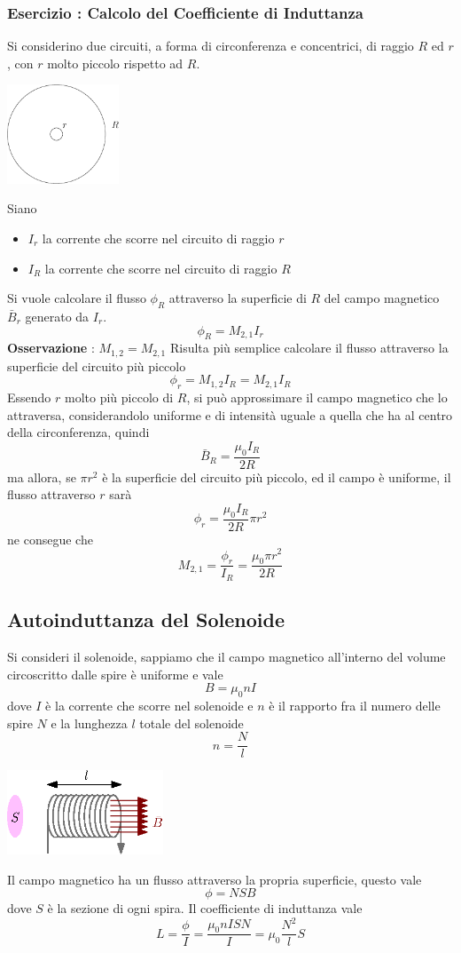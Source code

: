 \documentclass[10pt, letterpaper]{report}
\begin{document}
\subsubsection{Esercizio : Calcolo del Coefficiente di Induttanza}
Si considerino due circuiti, a forma di circonferenza e concentrici, di raggio 
$R$ ed $r$, con $r$ molto piccolo rispetto ad $R$.
\begin{center}
    \includegraphics[width=0.25\textwidth ]{images/cerchiConc.eps}
\end{center}
Siano\begin{itemize}
    \item $I_r$ la corrente che scorre nel circuito di 
    raggio $r$
    \item $I_R$ la corrente che scorre nel circuito di 
    raggio $R$
\end{itemize}
Si vuole calcolare il flusso $\phi_R$ attraverso la superficie di $R$ 
del campo magnetico $\bar B_r$ generato da $I_r$.
$$ \phi_R=M_{2,1}I_r$$
\textbf{Osservazione} : $M_{1,2}=M_{2,1}$\acc 
Risulta più semplice calcolare il flusso attraverso 
la superficie del circuito più piccolo
$$ \phi_r=M_{1,2}I_R=M_{2,1}I_R$$
Essendo $r$ molto più piccolo di $R$, si può approssimare 
il campo magnetico che lo attraversa, considerandolo 
uniforme e di intensità uguale a quella che ha al centro 
della circonferenza, quindi 
$$ \bar B_R=\frac{\mu_0I_R}{2R}$$
ma allora, se $\pi r^2$ è la superficie del circuito 
più piccolo, ed il campo è uniforme, il flusso attraverso 
$r$ sarà 
$$ \phi_r=\frac{\mu_0I_R}{2R}\pi r^2$$
ne consegue che  
$$ M_{2,1}=\frac{\phi_r}{I_R}=\frac{\mu_0\pi r^2}{2R}$$
\subsection{Autoinduttanza del Solenoide}
Si consideri il solenoide, sappiamo che il campo magnetico 
all'interno del volume circoscritto dalle spire è 
uniforme e vale 
$$ B=\mu_0nI$$
dove $I$ è la corrente che scorre nel solenoide e 
$n$ è il rapporto fra il numero delle spire $N$ e la lunghezza $l$ 
totale del solenoide 
$$ n=\frac{N}{l}$$
\begin{center}
    \includegraphics[width=0.35\textwidth ]{images/solenoide2.eps}
\end{center}
Il campo magnetico ha un flusso attraverso la propria 
superficie, questo vale 
$$ \phi=NSB$$
dove $S$ è la sezione di ogni spira. Il coefficiente 
di induttanza vale 
$$L=\frac{\phi}{I}=\frac{\mu_0nISN}{I}=\mu_0\frac{N^2}{l}S $$
\flowerLine 
\end{document}
